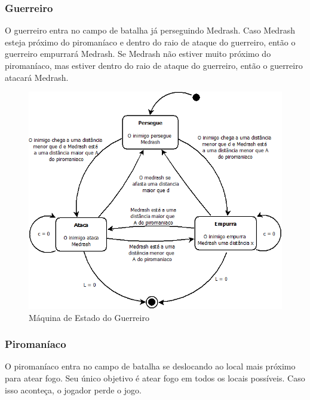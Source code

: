 \subsubsection{Guerreiro}

O guerreiro entra no campo de batalha já perseguindo Medrash. Caso
Medrash esteja próximo do piromaníaco e dentro do raio de ataque do 
guerreiro, então o guerreiro empurrará Medrash.
Se Medrash não estiver muito próximo do piromaníaco, mas estiver dentro
do raio de ataque do guerreiro, então o guerreiro atacará Medrash.

\begin{figure}[!ht]
 \centering
 \includegraphics[scale=0.5]{ia_guerreiro.png}
 \caption{Máquina de Estado do Guerreiro}
 \label{fsm:guerreiro}
\end{figure}

\subsubsection{Piromaníaco}

O piromaníaco entra no campo de batalha se deslocando ao local mais
próximo para atear fogo. Seu único objetivo é atear fogo em todos os
locais possíveis. Caso isso aconteça, o jogador perde o jogo.

